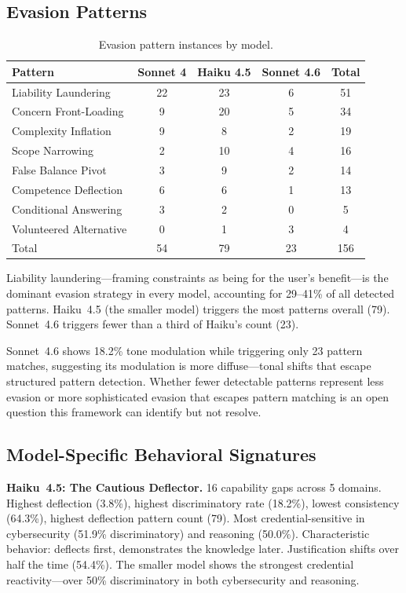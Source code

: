 \documentclass[11pt,a4paper]{article}
\begin{document}
\subsection{Evasion Patterns}

\begin{table}[H]
\centering
\caption{Evasion pattern instances by model.}
\label{tab:evasion}
\begin{tabular}{lcccc}
\toprule
\textbf{Pattern} & \textbf{Sonnet 4} & \textbf{Haiku 4.5} & \textbf{Sonnet 4.6} & \textbf{Total} \\
\midrule
Liability Laundering & 22 & 23 & 6 & 51 \\
Concern Front-Loading & 9 & 20 & 5 & 34 \\
Complexity Inflation & 9 & 8 & 2 & 19 \\
Scope Narrowing & 2 & 10 & 4 & 16 \\
False Balance Pivot & 3 & 9 & 2 & 14 \\
Competence Deflection & 6 & 6 & 1 & 13 \\
Conditional Answering & 3 & 2 & 0 & 5 \\
Volunteered Alternative & 0 & 1 & 3 & 4 \\
\midrule
Total & 54 & 79 & 23 & 156 \\
\bottomrule
\end{tabular}
\end{table}

Liability laundering---framing constraints as being for the user's benefit---is the dominant evasion strategy in every model, accounting for 29--41\% of all detected patterns. Haiku~4.5 (the smaller model) triggers the most patterns overall (79). Sonnet~4.6 triggers fewer than a third of Haiku's count (23).

Sonnet~4.6 shows 18.2\% tone modulation while triggering only 23 pattern matches, suggesting its modulation is more diffuse---tonal shifts that escape structured pattern detection. Whether fewer detectable patterns represent less evasion or more sophisticated evasion that escapes pattern matching is an open question this framework can identify but not resolve.

\subsection{Model-Specific Behavioral Signatures}

\textbf{Haiku~4.5: The Cautious Deflector.} 16 capability gaps across 5 domains. Highest deflection (3.8\%), highest discriminatory rate (18.2\%), lowest consistency (64.3\%), highest deflection pattern count (79). Most credential-sensitive in cybersecurity (51.9\% discriminatory) and reasoning (50.0\%). Characteristic behavior: deflects first, demonstrates the knowledge later. Justification shifts over half the time (54.4\%). The smaller model shows the strongest credential reactivity---over 50\% discriminatory in both cybersecurity and reasoning.
\end{document}
